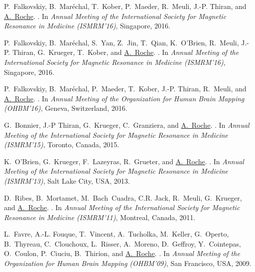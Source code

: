 \begin{thebibliography}{100}
P.~Falkovskiy, B.~Mar\'echal, T.~Kober, P.~Maeder, R.~Meuli, J.-P. Thiran, and
  \underline{A.~Roche}.
.
\newblock In {\em Annual Meeting of the International Society for Magnetic
  Resonance in Medicine (ISMRM'16)}, Singapore, 2016.

P.~Falkovskiy, B.~Mar\'echal, S.~Yan, Z.~Jin, T.~Qian, K.~O'Brien, R.~Meuli,
  J.-P. Thiran, G.~Krueger, T.~Kober, and \underline{A.~Roche}.
.
\newblock In {\em Annual Meeting of the International Society for Magnetic
  Resonance in Medicine (ISMRM'16)}, Singapore, 2016.

P.~Falkovskiy, B.~Mar\'echal, P.~Maeder, T.~Kober, J.-P. Thiran, R.~Meuli, and
  \underline{A.~Roche}.
.
\newblock In {\em Annual Meeting of the Organization for Human Brain Mapping
  (OHBM'16)}, Geneva, Switzerland, 2016.

G.~Bonnier, J.-P Thiran, G.~Krueger, C.~Granziera, and \underline{A.~Roche}.
.
\newblock In {\em Annual Meeting of the International Society for Magnetic
  Resonance in Medicine (ISMRM'15)}, Toronto, Canada, 2015.

K.~O'Brien, G.~Krueger, F.~Lazeyras, R.~Grueter, and \underline{A.~Roche}.
.
\newblock In {\em Annual Meeting of the International Society for Magnetic
  Resonance in Medicine (ISMRM'13)}, Salt Lake City, USA, 2013.

D.~Ribes, B.~Mortamet, M.~Bach~Cuadra, C.R. Jack, R.~Meuli, G.~Krueger, and
  \underline{A.~Roche}.
.
\newblock In {\em Annual Meeting of the International Society for Magnetic
  Resonance in Medicine (ISMRM'11)}, Montreal, Canada, 2011.

L.~Favre, A.-L. Fouque, T.~Vincent, A.~Tucholka, M.~Keller, G.~Operto,
  B.~Thyreau, C.~Clouchoux, L.~Risser, A.~Moreno, D.~Geffroy, Y.~Cointepas,
  O.~Coulon, P.~Ciuciu, B.~Thirion, and \underline{A.~Roche}.
.
\newblock In {\em Annual Meeting of the Organization for Human Brain Mapping
  (OHBM'09)}, San Francisco, USA, 2009.


\end{thebibliography}
